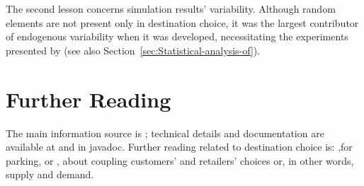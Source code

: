 The second lesson concerns simulation results' variability. 
Although random elements are not present only in destination choice, it was the largest contributor of endogenous variability when it was developed, necessitating the experiments presented by \citet[][]{HorniEtAl_TechRep_IVT_2011_b} (see also Section~\ref{sec:Statistical-analysis-of}).

\section{Further Reading}
The main information source is \citet[][]{%
HorniEtAl2011TrbLocationChoice,Horni_PhDThesis_2013}; 
technical details and documentation are available at \citet[][]{MATSIM-DC_Webpage_2015} and in \gls{javadoc}. 
Further reading related to destination choice is: \citet[][]{HorniEtAl_IATBRspec_2013},for parking, or \citet[][]{HorniEtAl_TechRep_IVT_2012}, about coupling customers' and retailers' choices or, in other words, supply and demand.


